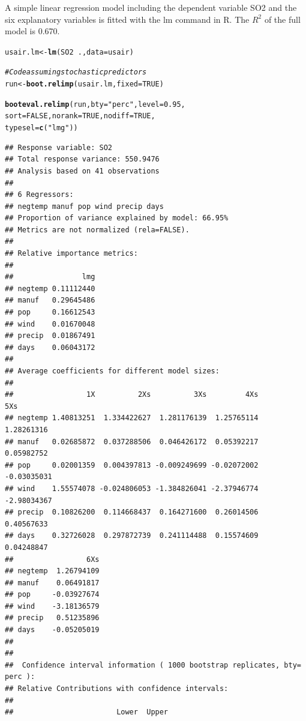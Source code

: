 \documentclass[11pt,a4paper,twoside]{book}\usepackage[]{graphicx}\usepackage[]{color}
\makeatletter
\newcommand{\hlnum}[1]{\textcolor[rgb]{0.686,0.059,0.569}{#1}}%
\newcommand{\hlstr}[1]{\textcolor[rgb]{0.192,0.494,0.8}{#1}}%
\newcommand{\hlcom}[1]{\textcolor[rgb]{0.678,0.584,0.686}{\textit{#1}}}%
\newcommand{\hlopt}[1]{\textcolor[rgb]{0,0,0}{#1}}%
\newcommand{\hlstd}[1]{\textcolor[rgb]{0.345,0.345,0.345}{#1}}%
\newcommand{\hlkwb}[1]{\textcolor[rgb]{0.69,0.353,0.396}{#1}}%
\newcommand{\hlkwc}[1]{\textcolor[rgb]{0.333,0.667,0.333}{#1}}%
\newcommand{\hlkwd}[1]{\textcolor[rgb]{0.737,0.353,0.396}{\textbf{#1}}}%
\newenvironment{kframe}{%
 \def\at@end@of@kframe{}%
 \ifinner\ifhmode%
  \def\at@end@of@kframe{\end{minipage}}%
  \begin{minipage}{\columnwidth}%
 \fi\fi%
 \def\FrameCommand##1{\hskip\@totalleftmargin \hskip-\fboxsep
 \colorbox{shadecolor}{##1}\hskip-\fboxsep
     \hskip-\linewidth \hskip-\@totalleftmargin \hskip\columnwidth}%
 \MakeFramed {\advance\hsize-\width
   \@totalleftmargin\z@ \linewidth\hsize
   \@setminipage}}%
 {\par\unskip\endMakeFramed%
 \at@end@of@kframe}
\newenvironment{knitrout}{}{} %
\makeatother
\begin{document}
A simple linear regression model including the dependent variable SO2 and the six explanatory variables is fitted with the lm command in R. The $R^2$ of the full model is 0.670. 

\begin{knitrout}
\color{fgcolor}\begin{kframe}
\begin{alltt}
\hlstd{usair.lm} \hlkwb{<-} \hlkwd{lm}\hlstd{(SO2}\hlopt{~}\hlstd{.,} \hlkwc{data} \hlstd{= usair)}


\hlcom{#Code assuming stochastic predictors}
\hlstd{run}\hlkwb{<-}\hlkwd{boot.relimp}\hlstd{(usair.lm,} \hlkwc{fixed}\hlstd{=}\hlnum{TRUE}\hlstd{)}

\hlkwd{booteval.relimp}\hlstd{(run,} \hlkwc{bty} \hlstd{=} \hlstr{"perc"}\hlstd{,} \hlkwc{level} \hlstd{=} \hlnum{0.95}\hlstd{,}
                \hlkwc{sort} \hlstd{=} \hlnum{FALSE}\hlstd{,} \hlkwc{norank} \hlstd{=} \hlnum{TRUE}\hlstd{,} \hlkwc{nodiff} \hlstd{=} \hlnum{TRUE}\hlstd{,}
                \hlkwc{typesel} \hlstd{=} \hlkwd{c}\hlstd{(}\hlstr{"lmg"}\hlstd{))}
\end{alltt}
\begin{verbatim}
## Response variable: SO2 
## Total response variance: 550.9476 
## Analysis based on 41 observations 
## 
## 6 Regressors: 
## negtemp manuf pop wind precip days 
## Proportion of variance explained by model: 66.95%
## Metrics are not normalized (rela=FALSE). 
## 
## Relative importance metrics: 
## 
##                lmg
## negtemp 0.11112440
## manuf   0.29645486
## pop     0.16612543
## wind    0.01670048
## precip  0.01867491
## days    0.06043172
## 
## Average coefficients for different model sizes: 
## 
##                 1X          2Xs          3Xs         4Xs         5Xs
## negtemp 1.40813251  1.334422627  1.281176139  1.25765114  1.28261316
## manuf   0.02685872  0.037288506  0.046426172  0.05392217  0.05982752
## pop     0.02001359  0.004397813 -0.009249699 -0.02072002 -0.03035031
## wind    1.55574078 -0.024806053 -1.384826041 -2.37946774 -2.98034367
## precip  0.10826200  0.114668437  0.164271600  0.26014506  0.40567633
## days    0.32726028  0.297872739  0.241114488  0.15574609  0.04248847
##                 6Xs
## negtemp  1.26794109
## manuf    0.06491817
## pop     -0.03927674
## wind    -3.18136579
## precip   0.51235896
## days    -0.05205019
## 
##  
##  Confidence interval information ( 1000 bootstrap replicates, bty= perc ): 
## Relative Contributions with confidence intervals: 
##  
##                        Lower  Upper

\end{verbatim}
\end{kframe}
\end{knitrout}
\end{document}
